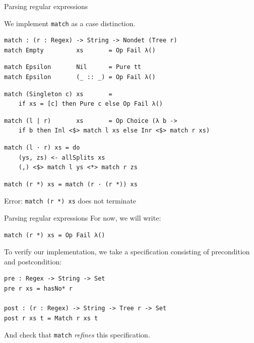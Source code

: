 \documentclass[ignorenonframetext,]{beamer}
\newcommand{\Agda}[1]{\texttt{#1}\xspace}
\newcommand{\match}{\Agda{match}}
\begin{document}
\begin{frame}[fragile]{Parsing regular expressions}

We implement \match as a case distinction.
\begin{verbatim}
match : (r : Regex) -> String -> Nondet (Tree r)
match Empty         xs       = Op Fail λ()
\end{verbatim}
\pause \vspace{-\baselineskip}
\begin{verbatim}
match Epsilon       Nil      = Pure tt
match Epsilon       (_ :: _) = Op Fail λ()
\end{verbatim}
\pause \vspace{-\baselineskip}
\begin{verbatim}
match (Singleton c) xs       =
    if xs = [c] then Pure c else Op Fail λ()
\end{verbatim}
\pause \vspace{-\baselineskip}
\begin{verbatim}
match (l | r)       xs       = Op Choice (λ b ->
    if b then Inl <$> match l xs else Inr <$> match r xs)
\end{verbatim}
\pause \vspace{-\baselineskip}
\begin{verbatim}
match (l · r) xs = do
    (ys, zs) <- allSplits xs
    (,) <$> match l ys <*> match r zs
\end{verbatim}
\pause \vspace{-\baselineskip}
\begin{verbatim}
match (r *) xs = match (r · (r *)) xs
\end{verbatim}
\pause
\alert{Error: \Agda{match (r *) xs} does not terminate}

\end{frame}

\begin{frame}[fragile]{Parsing regular expressions}
For now, we will write:
\begin{verbatim}
match (r *) xs = Op Fail λ()
\end{verbatim}

\pause

To verify our implementation, we take a specification consisting of precondition and postcondition:
\begin{verbatim}
pre : Regex -> String -> Set
pre r xs = hasNo* r

post : (r : Regex) -> String -> Tree r -> Set
post r xs t = Match r xs t
\end{verbatim}

And check that \Agda{match} \emph{refines} this specification.

\end{frame}
\end{document}
